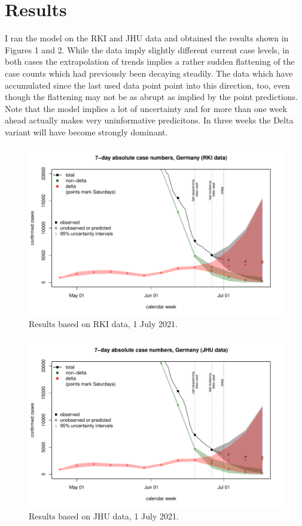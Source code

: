 \documentclass{article}
\begin{document}
\section{Results}

I ran the model on the RKI and JHU data and obtained the results shown in Figures 1 and 2. While the data imply slightly different current case levels, in both cases the extrapolation of trends implies a rather sudden flattening of the case counts which had previously been decaying steadily. The data which have accumulated since the last used data point point into this direction, too, even though the flattening may not be as abrupt as implied by the point predictions. Note that the model implies a lot of uncertainty and for more than one week ahead actually makes very uninformative predicitons. In three weeks the Delta variant will have become strongly dominant.

\begin{figure}
\center
\includegraphics[scale=0.6]{plots/plot_RKI_2021-07-01.pdf}
\caption{Results based on RKI data, 1 July 2021.}
\end{figure}

\begin{figure}
\center
\includegraphics[scale=0.6]{plots/plot_JHU_2021-07-01.pdf}
\caption{Results based on JHU data, 1 July 2021.}
\end{figure}
\end{document}
